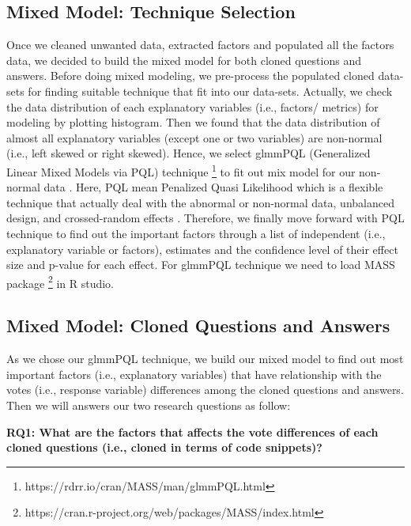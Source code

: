 \documentclass[conference]{IEEEtran}
\begin{document}
\subsection{Mixed Model: Technique Selection}
Once we cleaned unwanted data, extracted factors and populated all the factors data, we decided to build the mixed model for both cloned questions and answers. Before doing mixed modeling, we pre-process the populated cloned  data-sets for finding suitable technique that fit into our data-sets. Actually, we check the data distribution of each explanatory variables (i.e., factors/ metrics) for modeling by plotting histogram. Then we found that the data distribution of almost all explanatory variables (except one or two variables) are non-normal (i.e., left skewed or right skewed). Hence, we select glmmPQL (Generalized Linear Mixed Models via PQL) technique \footnote{https://rdrr.io/cran/MASS/man/glmmPQL.html} to fit out mix model for our non-normal data \cite{b13}.  Here, PQL mean Penalized Quasi Likelihood which is a flexible technique that actually deal with the abnormal or non-normal data, unbalanced design, and crossed-random effects \cite{b13}. Therefore, we finally move forward with PQL technique to find out the important factors through a list of independent (i.e., explanatory variable or factors), estimates and the confidence level of their effect size and p-value for each effect. For glmmPQL technique we need to load MASS package \footnote{https://cran.r-project.org/web/packages/MASS/index.html} in R studio.

\subsection{Mixed Model: Cloned Questions and Answers}
As we chose our glmmPQL technique, we build our mixed model to find out most important factors (i.e., explanatory variables) that have relationship with the votes (i.e., response variable) differences among the cloned questions and answers.  Then we will answers our two research questions as follow:
\newline 

\textbf{RQ1: What are the factors that affects the vote differences of each cloned questions (i.e., cloned in terms of code snippets)?}
\newline
\end{document}
